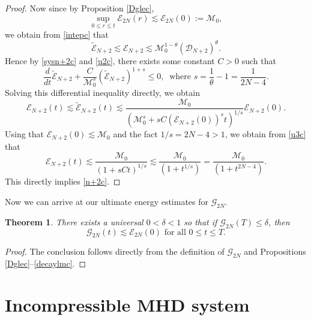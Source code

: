 \documentclass[a4paper,reqno,11pt]{amsart}
\numberwithin{equation}{section}
\newtheorem{thm}[lem]{Theorem}
\begin{document}
\begin{proof}
Now since by Proposition \ref{Dglec},
\begin{equation}
\sup_{0\le r\le t}\mathcal{E}_{2N} (r)\lesssim
\mathcal{E}_{2N} (0) :=\mathcal{M}_0,
\end{equation}
we obtain from  \eqref{intepc} that
\begin{equation} \label{u2c}
\tilde{\mathcal{E}}_{N+2} \lesssim\mathcal{E}_{N+2} \lesssim\mathcal{M}_0^{1-\theta}
(\mathcal{D}_{N+2} )^\theta.
\end{equation}
Hence by \eqref{sysn+2c} and \eqref{u2c}, there exists some constant $C>0$
such that
\begin{equation}
\frac{d}{dt} \tilde{\mathcal{E}}_{N+2} +\frac{C}{\mathcal{M}_0^s}
(\tilde{\mathcal{E}}_{N+2} )^{1+s}\le 0,\ \text{ where } s =
\frac{1}{\theta}-1 = \frac{1}{2N-4}.
\end{equation}
Solving this differential inequality directly, we obtain
\begin{equation} \label{u3c}
\mathcal{E}_{N+2} (t){\lesssim} \tilde{\mathcal{E}}_{N+2} (t){\lesssim} \frac{\mathcal{M}_0}{(\mathcal{M}_0^s
+ s C( \mathcal{E}_{N+2} (0))^s t)^{1/s} }
{\mathcal{E}}_{N+2} (0).
\end{equation}
Using that ${\mathcal{E}}_{N+2} (0)\lesssim\mathcal{M}_0 $ and
the fact $1/s=2N-4>1$, we obtain from \eqref{u3c} that
\begin{equation}
{\mathcal{E}}_{N+2} (t)\lesssim
\frac{\mathcal{M}_0}{(1+sCt)^{1/s} }\lesssim
\frac{\mathcal{M}_0}{(1+t^{1/s}) } =
\frac{\mathcal{M}_0}{(1+t^{2N-4}) }.
\end{equation}
This directly implies \eqref{n+2c}.
\end{proof}

Now we can arrive at our ultimate energy estimates for
$\mathcal{G}_{2N} $.
\begin{thm}\label{Apc}
There exists a universal $0 < \delta < 1$ so that if $
\mathcal{G}_{2N} (T) \le \delta$, then
\begin{equation}\label{Aprioric}
\mathcal{G}_{2N} (t) {\lesssim}\mathcal{E}_{2N} (0) \text{ for all }0 \le t \le
 T.
\end{equation}
\end{thm}
\begin{proof}
The conclusion follows directly from the definition of $\mathcal{G}_{2N}$ and Propositions
\ref{Dglec}--\ref{decaylmc}.
\end{proof}

\section{Incompressible MHD system}
\end{document}
